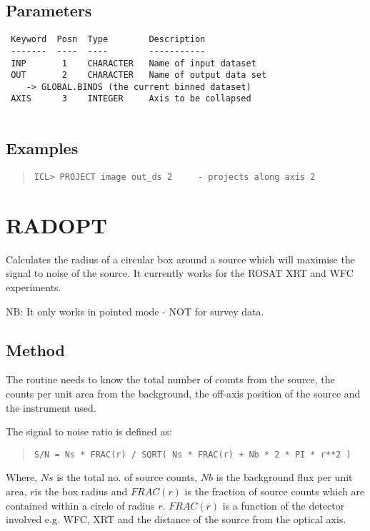 \documentclass{book}
\renewcommand{\_}{{\tt\char'137}}     %
\begin{document}
\subsection{Parameters}
\begin{verbatim}
 Keyword  Posn  Type        Description
 -------  ----  ----        -----------
 INP       1    CHARACTER   Name of input dataset
 OUT       2    CHARACTER   Name of output data set
    -> GLOBAL.BINDS (the current binned dataset)
 AXIS      3    INTEGER     Axis to be collapsed
 
\end{verbatim}\subsection{Examples}
\begin{quote}\begin{verbatim}
ICL> PROJECT image out_ds 2     - projects along axis 2
\end{verbatim}\end{quote}
\section{RADOPT}
Calculates the radius of a circular box around a source which
will maximise the signal to noise of the source. It currently
works for the ROSAT XRT and WFC experiments.
 
NB: It only works in pointed mode - NOT for survey data.
 
\subsection{Method}
The routine needs to know the total number of counts from the
source, the counts per unit area from the background, the
off-axis position of the source and the instrument used.
 
The signal to noise ratio is defined as:
 
\begin{quote}\begin{verbatim}
S/N = Ns * FRAC(r) / SQRT( Ns * FRAC(r) + Nb * 2 * PI * r**2 )
\end{verbatim}\end{quote}
Where, $Ns$ is the total no. of source counts, $Nb$ is
the background flux per unit area, $r $is the box radius and
$FRAC(r)$ is the fraction
of source counts which are contained within a circle of radius
$r$.
$FRAC(r)$ is a function of the detector involved e.g. WFC, XRT and
the distance of the source from the optical axis.
 
\end{document}
